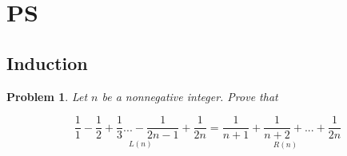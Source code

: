 \documentclass{article}
\newtheorem{problem}[theorem]{Problem}
\begin{document}
\section{PS}

\subsection{\protect\bigskip Induction}

\begin{problem}
Let $n$ be a nonnegative integer. Prove that
\end{problem}

\begin{equation*}
\text{ }\underset{L(n)}{\frac{1}{1}-\frac{1}{2}+\frac{1}{3}...-\frac{1}{2n-1}%
+\frac{1}{2n}}=\underset{R(n)}{\frac{1}{n+1}+\frac{1}{n+2}+...+\frac{1}{2n}%
\text{ }}
\end{equation*}
\end{document}
